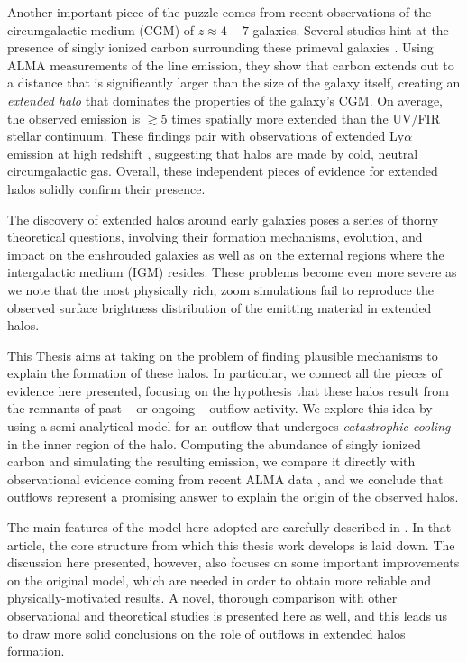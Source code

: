 \documentclass[a4paper, 12pt]{article}
\begin{document}
Another important piece of the puzzle comes from recent observations of the circumgalactic medium (CGM) of $z\approx4-7$ galaxies. Several studies hint at the presence of singly ionized carbon surrounding these primeval galaxies \citep{Fujimoto19, Fujimoto:2020qzo, ginolfi:2019, herrera2021kiloparsec}. Using ALMA measurements of the \CII line emission, they show that carbon extends out to a distance that is significantly larger than the size of the galaxy itself, creating an \textit{extended halo} that dominates the properties of the galaxy's CGM. On average, the observed emission is $\gtrsim 5$ times spatially more extended than the UV/FIR stellar continuum. These findings pair with observations of extended Ly$\alpha$ emission at high redshift \citep{Wisotzki16,Wisotzki18, Kakuma19}, suggesting that halos are made by cold, neutral circumgalactic gas. Overall, these independent pieces of evidence for extended halos solidly confirm their presence. 

The discovery of extended halos around early galaxies poses a series of thorny theoretical questions, involving their formation mechanisms, evolution, and impact on the enshrouded galaxies as well as on the external regions where the intergalactic medium (IGM) resides. These problems become even more severe as we note that the most physically rich, zoom simulations \citep{pallottini2017b, Arata:2019} fail to reproduce the observed surface brightness distribution of the emitting material in extended halos.

This Thesis aims at taking on the problem of finding plausible mechanisms to explain the formation of these halos. In particular, we connect all the pieces of evidence here presented, focusing on the hypothesis that these halos result from the remnants of past -- or ongoing -- outflow activity. We explore this idea by using a semi-analytical model for an outflow that undergoes \textit{catastrophic cooling} in the inner region of the halo. Computing the abundance of singly ionized carbon and simulating the resulting \CII emission, we compare it directly with observational evidence coming from recent ALMA data \citep{Fujimoto19, Fujimoto:2020qzo}, and we conclude that outflows represent a promising answer to explain the origin of the observed \CII halos. 

The main features of the model here adopted are carefully described in \citet{Pizzati20}. In that article, the core structure from which this thesis work develops is laid down. The discussion here presented, however, also focuses on some important improvements on the original model, which are needed in order to obtain more reliable and physically-motivated results. A novel, thorough comparison with other observational and theoretical studies is presented here as well, and this leads us to draw more solid conclusions on the role of outflows in extended halos formation.


\newpage

\end{document}
